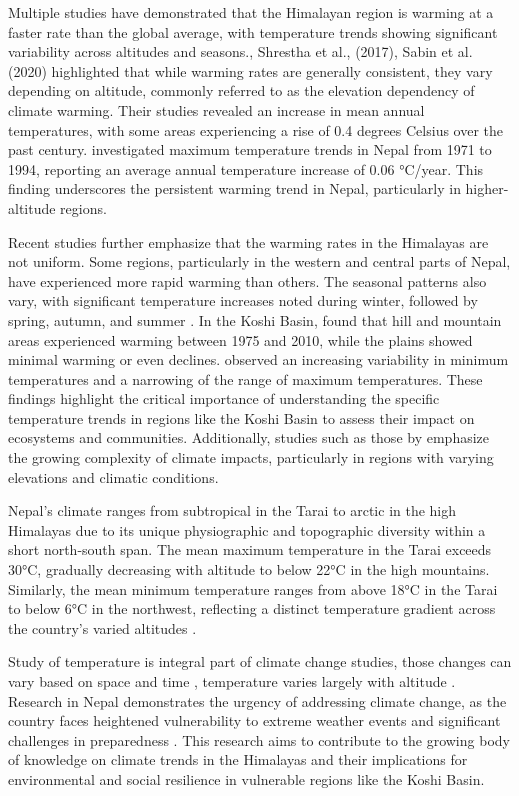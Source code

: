 Multiple studies have demonstrated that the Himalayan region is warming at a faster rate than the global average, with temperature trends showing significant variability across altitudes and seasons.\citet{hingane_longterm_1985,shrestha_observed_2017,Sabin2020}, Shrestha et al., (2017), Sabin et al. (2020) highlighted that while warming rates are generally consistent, they vary depending on altitude, commonly referred to as the elevation dependency of climate warming. Their studies revealed an increase in mean annual temperatures, with some areas experiencing a rise of 0.4 degrees Celsius over the past century.\citet{shrestha_maximum_1999} investigated maximum temperature trends in Nepal from 1971 to 1994, reporting an average annual temperature increase of 0.06 °C/year. This finding underscores the persistent warming trend in Nepal, particularly in higher-altitude regions.


Recent studies further emphasize that the warming rates in the Himalayas are not uniform. Some regions, particularly in the western and central parts of Nepal, have experienced more rapid warming than others. The seasonal patterns also vary, with significant temperature increases noted during winter, followed by spring, autumn, and summer \citep{agarwal_analysis_2016}. In the Koshi Basin, \citet{shrestha_observed_2017}  found that hill and mountain areas experienced warming between 1975 and 2010, while the plains showed minimal warming or even declines.\citet{bastakoti_agriculture_2017} observed an increasing variability in minimum temperatures and a narrowing of the range of maximum temperatures. These findings highlight the critical importance of understanding the specific temperature trends in regions like the Koshi Basin to assess their impact on ecosystems and communities. Additionally, studies such as those by\citet{poudel_spatiotemporal_2020} emphasize the growing complexity of climate impacts, particularly in regions with varying elevations and climatic conditions.


Nepal's climate ranges from subtropical in the Tarai to arctic in the high Himalayas due to its unique physiographic and topographic diversity within a short north-south span. The mean maximum temperature in the Tarai exceeds 30°C, gradually decreasing with altitude to below 22°C in the high mountains. Similarly, the mean minimum temperature ranges from above 18°C in the Tarai to below 6°C in the northwest, reflecting a distinct temperature gradient across the country's varied altitudes \citep{marahatta_temporal_2009}.


Study of temperature is integral part of climate change studies, those changes can vary based on space and time \citep{bajracharya_future_2023}, temperature varies largely with altitude \citep{chand_trend_2019}. Research in Nepal demonstrates the urgency of addressing climate change, as the country faces heightened vulnerability to extreme weather events and significant challenges in preparedness \citep{chapagain_unpacking_2021}. This research aims to contribute to the growing body of knowledge on climate trends in the Himalayas and their implications for environmental and social resilience in vulnerable regions like the Koshi Basin.

